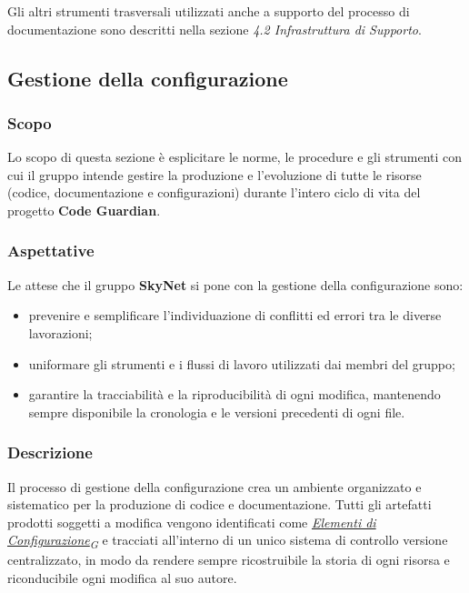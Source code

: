 \documentclass[12pt, a4paper]{article}
\newcommand{\urlglossario}{https://skynetunigroup.github.io/Code_Guardian/Documentazione/PB/glossario_v2.0.0.pdf} %
\newcommand{\glo}[2]{\href{\urlglossario\#nameddest=#2}{#1\textsubscript{G}}}
\begin{document}
Gli altri strumenti trasversali utilizzati anche a supporto del processo di documentazione sono descritti nella sezione \textit{4.2 Infrastruttura di Supporto}.

\subsection{Gestione della configurazione}

\subsubsection{Scopo}
Lo scopo di questa sezione è esplicitare le norme, le procedure e gli strumenti con cui il gruppo intende gestire la produzione e l'evoluzione di tutte le risorse (codice, documentazione e configurazioni) durante l'intero ciclo di vita del progetto \textbf{Code Guardian}.

\subsubsection{Aspettative}
Le attese che il gruppo \textbf{SkyNet} si pone con la gestione della configurazione sono:
\begin{itemize}
    \item prevenire e semplificare l'individuazione di conflitti ed errori tra le diverse lavorazioni;
    \item uniformare gli strumenti e i flussi di lavoro utilizzati dai membri del gruppo;
    \item garantire la tracciabilità e la riproducibilità di ogni modifica, mantenendo sempre disponibile la cronologia e le versioni precedenti di ogni file.
\end{itemize}

\subsubsection{Descrizione}
Il processo di gestione della configurazione crea un ambiente organizzato e sistematico per la produzione di codice e documentazione. Tutti gli artefatti prodotti soggetti a modifica vengono identificati come \textit{\glo{Elementi di Configurazione}{elementi-configurazione}} e tracciati all'interno di un unico sistema di controllo versione centralizzato, in modo da rendere sempre ricostruibile la storia di ogni risorsa e riconducibile ogni modifica al suo autore.
\end{document}

